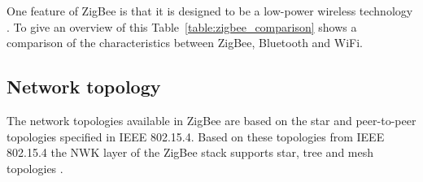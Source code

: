 One feature of ZigBee is that it is designed to be a low-power wireless technology . To give an overview of this Table~\ref{table:zigbee_comparison} shows a comparison of the characteristics between ZigBee, Bluetooth and WiFi.

{
\renewcommand{\arraystretch}{1.2}
\begin{table}[H]
\centering
\caption{ZigBee, Bluetooth, and WiFi comparison \citep{digi2019rf, yang2014internet, zigbee_alliance_2019}}
\label{table:zigbee_comparison}
\end{table}
}

\subsection{Network topology}
The network topologies available in ZigBee are based on the star and peer-to-peer topologies specified in IEEE 802.15.4. Based on these topologies from IEEE 802.15.4 the NWK layer of the ZigBee stack supports star, tree and mesh topologies \citep{farahani2011zigbee}.


